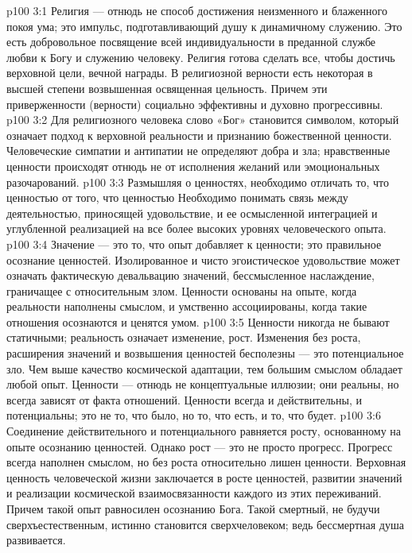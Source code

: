 \vs p100 3:1 Религия --- отнюдь не способ достижения неизменного и блаженного покоя ума; это импульс, подготавливающий душу к динамичному служению. Это есть добровольное посвящение всей индивидуальности в преданной службе любви к Богу и служению человеку. Религия готова сделать все, чтобы достичь верховной цели, вечной награды. В религиозной верности есть некоторая в высшей степени возвышенная освященная цельность. Причем эти приверженности (верности) социально эффективны и духовно прогрессивны.
\vs p100 3:2 Для религиозного человека слово «Бог» становится символом, который означает подход к верховной реальности и признанию божественной ценности. Человеческие симпатии и антипатии не определяют добра и зла; нравственные ценности происходят отнюдь не от исполнения желаний или эмоциональных разочарований.
\vs p100 3:3 Размышляя о ценностях, необходимо отличать то, что ценностью  от того, что ценностью  Необходимо понимать связь между деятельностью, приносящей удовольствие, и ее осмысленной интеграцией и углубленной реализацией на все более высоких уровнях человеческого опыта.
\vs p100 3:4 \pc Значение --- это то, что опыт добавляет к ценности; это правильное осознание ценностей. Изолированное и чисто эгоистическое удовольствие может означать фактическую девальвацию значений, бессмысленное наслаждение, граничащее с относительным злом. Ценности основаны на опыте, когда реальности наполнены смыслом, и умственно ассоциированы, когда такие отношения осознаются и ценятся умом.
\vs p100 3:5 \pc Ценности никогда не бывают статичными; реальность означает изменение, рост. Изменения без роста, расширения значений и возвышения ценностей бесполезны --- это потенциальное зло. Чем выше качество космической адаптации, тем большим смыслом обладает любой опыт. Ценности --- отнюдь не концептуальные иллюзии; они реальны, но всегда зависят от факта отношений. Ценности всегда и действительны, и потенциальны; это не то, что было, но то, что есть, и то, что будет.
\vs p100 3:6 Соединение действительного и потенциального равняется росту, основанному на опыте осознанию ценностей. Однако рост --- это не просто прогресс. Прогресс всегда наполнен смыслом, но без роста относительно лишен ценности. Верховная ценность человеческой жизни заключается в росте ценностей, развитии значений и реализации космической взаимосвязанности каждого из этих переживаний. Причем такой опыт равносилен осознанию Бога. Такой смертный, не будучи сверхъестественным, истинно становится сверхчеловеком; ведь бессмертная душа развивается.
